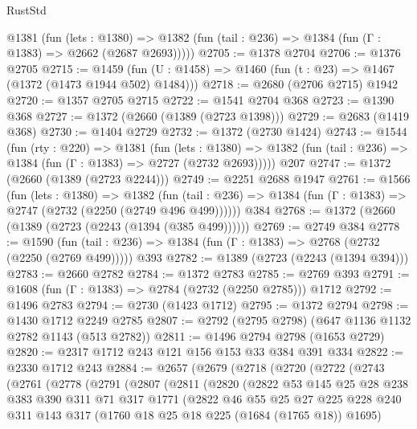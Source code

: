 \begin{lexlean}{RustStd}
\begin{coremodule}
    @1381
      (fun (lets : @1380) =>
      @1382 (fun (tail : @236) => @1384 (fun (Γ : @1383) => @2662 (@2687 @2693)))))
@2705 := @1378 @2704
@2706 := @1376 @2705
@2715 := @1459 (fun (U : @1458) => @1460 (fun (t : @23) => @1467 (@1372 (@1473 @1944 @502) @1484)))
@2718 := @2680 (@2706 @2715) @1942
@2720 := @1357 @2705 @2715
@2722 := @1541 @2704 @368
@2723 := @1390 @368
@2727 := @1372 (@2660 (@1389 (@2723 @1398)))
@2729 := @2683 (@1419 @368)
@2730 := @1404 @2729
@2732 := @1372 (@2730 @1424)
@2743 := @1544
    (fun (rty : @220) =>
    @1381
      (fun (lets : @1380) =>
      @1382 (fun (tail : @236) => @1384 (fun (Γ : @1383) => @2727 (@2732 @2693)))))
    @207
@2747 := @1372 (@2660 (@1389 (@2723 @2244)))
@2749 := @2251 @2688 @1947
@2761 := @1566
    (fun (lets : @1380) =>
    @1382 (fun (tail : @236) => @1384 (fun (Γ : @1383) => @2747 (@2732 (@2250 (@2749 @496 @499))))))
    @384
@2768 := @1372 (@2660 (@1389 (@2723 (@2243 (@1394 (@385 @499))))))
@2769 := @2749 @384
@2778 := @1590
    (fun (tail : @236) => @1384 (fun (Γ : @1383) => @2768 (@2732 (@2250 (@2769 @499)))))
    @393
@2782 := @1389 (@2723 (@2243 (@1394 @394)))
@2783 := @2660 @2782
@2784 := @1372 @2783
@2785 := @2769 @393
@2791 := @1608 (fun (Γ : @1383) => @2784 (@2732 (@2250 @2785))) @1712
@2792 := @1496 @2783
@2794 := @2730 (@1423 @1712)
@2795 := @1372 @2794
@2798 := @1430 @1712 @2249 @2785
@2807 := @2792 (@2795 @2798) (@647 @1136 @1132 @2782 @1143 (@513 @2782))
@2811 := @1496 @2794 @2798 (@1653 @2729)
@2820 := @2317 @1712 @243 @121 @156 @153 @33 @384 @391 @334
@2822 := @2330 @1712 @243
@2884 := @2657
    (@2679
      (@2718
        (@2720
          (@2722
            (@2743
              (@2761
                (@2778
                  (@2791
                    (@2807
                      (@2811
                        (@2820
                          (@2822
                            @53
                            @145
                            @25
                            @28
                            @238
                            @383
                            @390
                            @311
                            @71
                            @317
                            @1771
                            (@2822
                              @46
                              @55
                              @25
                              @27
                              @225
                              @228
                              @240
                              @311
                              @143
                              @317
                              (@1760 @18 @25 @18 @225 (@1684 (@1765 @18)) @1695)

\end{coremodule}
\end{lexlean}
